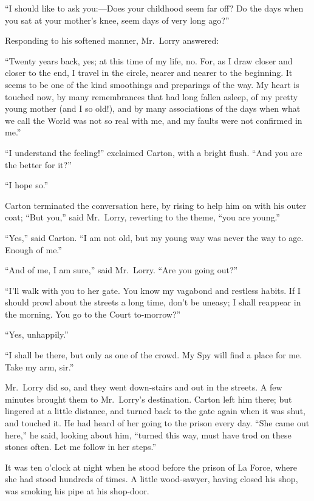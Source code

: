 ``I should like to ask you:---Does your childhood seem far off?  Do the
days when you sat at your mother's knee, seem days of very long ago?''

Responding to his softened manner, Mr.\ Lorry answered:

``Twenty years back, yes; at this time of my life, no.  For, as I draw
closer and closer to the end, I travel in the circle, nearer and
nearer to the beginning.  It seems to be one of the kind smoothings
and preparings of the way.  My heart is touched now, by many
remembrances that had long fallen asleep, of my pretty young mother
(and I so old!), and by many associations of the days when what we
call the World was not so real with me, and my faults were not
confirmed in me.''

``I understand the feeling!'' exclaimed Carton, with a bright flush.
``And you are the better for it?''

``I hope so.''

Carton terminated the conversation here, by rising to help him on
with his outer coat; ``But you,'' said Mr.\ Lorry, reverting to the theme,
``you are young.''

``Yes,'' said Carton.  ``I am not old, but my young way was never the
way to age.  Enough of me.''

``And of me, I am sure,'' said Mr.\ Lorry.  ``Are you going out?''

``I'll walk with you to her gate.  You know my vagabond and restless
habits.  If I should prowl about the streets a long time, don't be
uneasy; I shall reappear in the morning.  You go to the Court to-morrow?''

``Yes, unhappily.''

``I shall be there, but only as one of the crowd.  My Spy will find a
place for me.  Take my arm, sir.''

Mr.\ Lorry did so, and they went down-stairs and out in the streets.
A few minutes brought them to Mr.\ Lorry's destination.  Carton left
him there; but lingered at a little distance, and turned back to the
gate again when it was shut, and touched it.  He had heard of her
going to the prison every day.  ``She came out here,'' he said, looking
about him, ``turned this way, must have trod on these stones often.
Let me follow in her steps.''

It was ten o'clock at night when he stood before the prison of La
Force, where she had stood hundreds of times.  A little wood-sawyer,
having closed his shop, was smoking his pipe at his shop-door.

